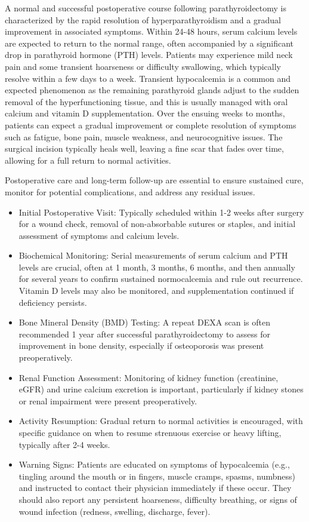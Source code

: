 A normal and successful postoperative course following parathyroidectomy is characterized by the rapid resolution of hyperparathyroidism and a gradual improvement in associated symptoms. Within 24-48 hours, serum calcium levels are expected to return to the normal range, often accompanied by a significant drop in parathyroid hormone (PTH) levels. Patients may experience mild neck pain and some transient hoarseness or difficulty swallowing, which typically resolve within a few days to a week. Transient hypocalcemia is a common and expected phenomenon as the remaining parathyroid glands adjust to the sudden removal of the hyperfunctioning tissue, and this is usually managed with oral calcium and vitamin D supplementation. Over the ensuing weeks to months, patients can expect a gradual improvement or complete resolution of symptoms such as fatigue, bone pain, muscle weakness, and neurocognitive issues. The surgical incision typically heals well, leaving a fine scar that fades over time, allowing for a full return to normal activities.

Postoperative care and long-term follow-up are essential to ensure sustained cure, monitor for potential complications, and address any residual issues.

\begin{itemize}
  \item Initial Postoperative Visit: Typically scheduled within 1-2 weeks after surgery for a wound check, removal of non-absorbable sutures or staples, and initial assessment of symptoms and calcium levels.
  \item Biochemical Monitoring: Serial measurements of serum calcium and PTH levels are crucial, often at 1 month, 3 months, 6 months, and then annually for several years to confirm sustained normocalcemia and rule out recurrence. Vitamin D levels may also be monitored, and supplementation continued if deficiency persists.
  \item Bone Mineral Density (BMD) Testing: A repeat DEXA scan is often recommended 1 year after successful parathyroidectomy to assess for improvement in bone density, especially if osteoporosis was present preoperatively.
  \item Renal Function Assessment: Monitoring of kidney function (creatinine, eGFR) and urine calcium excretion is important, particularly if kidney stones or renal impairment were present preoperatively.
  \item Activity Resumption: Gradual return to normal activities is encouraged, with specific guidance on when to resume strenuous exercise or heavy lifting, typically after 2-4 weeks.
  \item Warning Signs: Patients are educated on symptoms of hypocalcemia (e.g., tingling around the mouth or in fingers, muscle cramps, spasms, numbness) and instructed to contact their physician immediately if these occur. They should also report any persistent hoarseness, difficulty breathing, or signs of wound infection (redness, swelling, discharge, fever).
\end{itemize}

